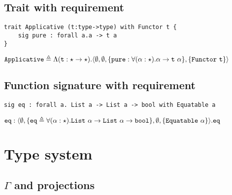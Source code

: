 \documentclass{article}[11pt]
\newcommand{\term}[1]{\verb~#1~}
\begin{document}
    \subsection{Trait with requirement}\label{subsec:trait-with-requirement}

    \begin{verbatim}
trait Applicative (t:type->type) with Functor t {
    sig pure : forall a.a -> t a
}
    \end{verbatim}

    \noindent
    \begin{math}
        \term{Applicative} \triangleq \Lambda(\term{t}:\star \rightarrow \star).
        \langle
        \emptyset,
        \emptyset,
        \{ \term{pure} : \forall(\alpha:\star).\alpha \rightarrow \term{t}~\alpha \},
        \{ \term{Functor}~\term{t} \}
        \rangle
    \end{math}

    \subsection{Function signature with requirement}\label{subsec:function-signature-with-requirement}

    \begin{verbatim}
sig eq : forall a. List a -> List a -> bool with Equatable a
    \end{verbatim}

    \noindent
    \begin{math}
        \term{eq} : \langle
        \emptyset,
        \{ \term{eq} \triangleq \forall(\alpha:\star).\term{List}~\alpha \rightarrow \term{List}~\alpha \rightarrow \term{bool} \},
        \emptyset,
        \{ \term{Equatable} ~ \alpha \}
        \rangle.\term{eq}
    \end{math}


    \section{Type system}\label{sec:type-system}

    \subsection{$\Gamma$ and projections}\label{subsec:$gamma$-projections-and-extraction}
\end{document}
